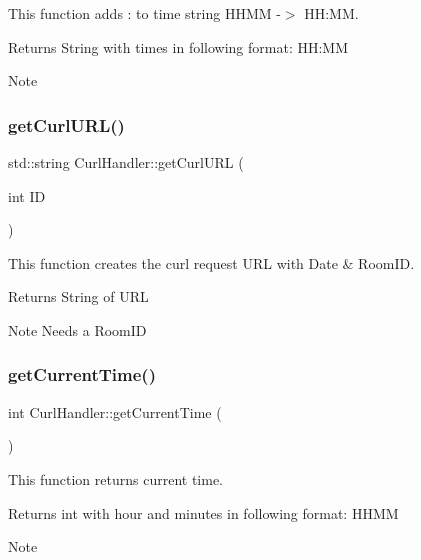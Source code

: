 This function adds \+: to time string H\+H\+MM -\/$>$ HH\+:MM. 

\begin{DoxyReturn}{Returns}
String with times in following format\+: HH\+:MM 
\end{DoxyReturn}
\begin{DoxyNote}{Note}

\end{DoxyNote}
\mbox{\label{classCurlHandler_a967784524e6d6d95b1d7089e3221fbfb}} 
\subsubsection{\texorpdfstring{get\+Curl\+U\+R\+L()}{getCurlURL()}}
{\footnotesize\ttfamily std\+::string Curl\+Handler\+::get\+Curl\+U\+RL (\begin{DoxyParamCaption}\item[{int}]{ID }\end{DoxyParamCaption})}



This function creates the curl request U\+RL with Date \& Room\+ID. 

\begin{DoxyReturn}{Returns}
String of U\+RL 
\end{DoxyReturn}
\begin{DoxyNote}{Note}
Needs a Room\+ID 
\end{DoxyNote}
\mbox{\label{classCurlHandler_a54e7bc698682a0b313b3de0f6d2c7cf4}} 
\subsubsection{\texorpdfstring{get\+Current\+Time()}{getCurrentTime()}}
{\footnotesize\ttfamily int Curl\+Handler\+::get\+Current\+Time (\begin{DoxyParamCaption}{ }\end{DoxyParamCaption})}



This function returns current time. 

\begin{DoxyReturn}{Returns}
int with hour and minutes in following format\+: H\+H\+MM 
\end{DoxyReturn}
\begin{DoxyNote}{Note}

\end{DoxyNote}
\mbox{\label{classCurlHandler_af36e06319f16a97938bfb9a2ee8c0fa6}} 

